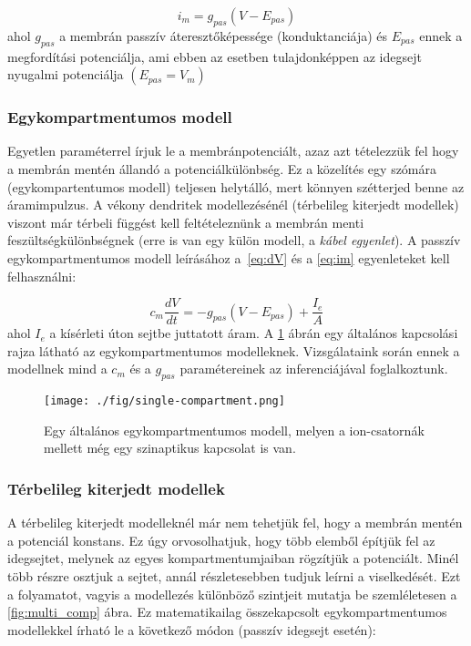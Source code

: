 \begin{equation}\label{eq:im}
	i_m = g_{pas}\left( V-E_{pas}\right)
\end{equation}
ahol $g_{pas}$ a membrán passzív áteresztőképessége (konduktanciája) és $E_{pas}$ ennek a megfordítási potenciálja, ami ebben az esetben tulajdonképpen az idegsejt nyugalmi potenciálja $(E_{pas} = V_{m})$



\subsubsection{Egykompartmentumos modell}\label{sec:single-comp}
Egyetlen paraméterrel írjuk le a membránpotenciált, azaz azt tételezzük fel hogy a membrán mentén állandó a potenciálkülönbség. Ez a közelítés egy szómára (egykompartentumos modell) teljesen helytálló, mert könnyen szétterjed benne az áramimpulzus. A vékony dendritek modellezésénél (térbelileg kiterjedt modellek) viszont már térbeli függést kell feltételeznünk a membrán menti feszültségkülönbségnek (erre is van egy külön modell, a \textit{kábel egyenlet}).
A passzív egykompartmentumos modell leírásához a~\ref{eq:dV} és a \ref{eq:im} egyenleteket kell felhasználni:

\begin{equation}\label{eq:one_comp}
	c_m \dfrac{dV}{dt} = -g_{pas} \left( V-E_{pas} \right) + \dfrac{I_e}{A}
\end{equation}
ahol $I_e$ a kísérleti úton sejtbe juttatott áram. A \ref{fig:single_comp} ábrán egy általános kapcsolási rajza látható az egykompartmentumos modelleknek. Vizsgálataink során ennek a modellnek mind a $c_m$ és a $g_{pas}$ paramétereinek az inferenciájával foglalkoztunk.

\begin{figure}[!htb]
	\centering
	\texttt{[image: ./fig/single-compartment.png]}
	\caption[Egykompartmentumos modell]{\cite{dayan2001theoretical} Egy általános egykompartmentumos modell, melyen a ion-csatornák mellett még egy szinaptikus kapcsolat is van.}
	\label{fig:single_comp}
\end{figure}



\FloatBarrier
\subsubsection{Térbelileg kiterjedt modellek}\label{sec:multi-comp}
A térbelileg kiterjedt modelleknél már nem tehetjük fel, hogy a membrán mentén a potenciál konstans. Ez úgy orvosolhatjuk, hogy több elemből építjük fel az idegsejtet, melynek az egyes kompartmentumjaiban rögzítjük a potenciált. Minél több részre osztjuk a sejtet, annál részletesebben tudjuk leírni a viselkedését. Ezt a folyamatot, vagyis a modellezés különböző szintjeit mutatja be szemléletesen a \ref{fig:multi_comp} ábra. Ez matematikailag összekapcsolt egykompartmentumos modellekkel írható le a következő módon (passzív idegsejt esetén):

